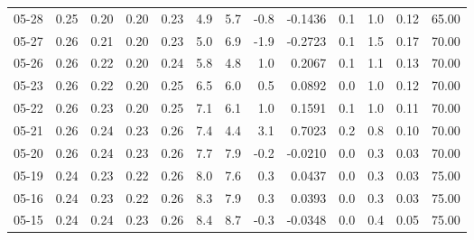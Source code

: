 \begin{threeparttable}
{\begin{tabular}{lrrrrrrrrrrrr}
  05-28 &          0.25 &          0.20 &          0.20 &        0.23 &                 4.9 &                 5.7 &       -0.8 &      -0.1436 &                 0.1 &              1.0 &            0.12 &                  65.00 \\
  05-27 &          0.26 &          0.21 &          0.20 &        0.23 &                 5.0 &                 6.9 &       -1.9 &      -0.2723 &                 0.1 &              1.5 &            0.17 &                  70.00 \\
  05-26 &          0.26 &          0.22 &          0.20 &        0.24 &                 5.8 &                 4.8 &        1.0 &       0.2067 &                 0.1 &              1.1 &            0.13 &                  70.00 \\
  05-23 &          0.26 &          0.22 &          0.20 &        0.25 &                 6.5 &                 6.0 &        0.5 &       0.0892 &                 0.0 &              1.0 &            0.12 &                  70.00 \\
  05-22 &          0.26 &          0.23 &          0.20 &        0.25 &                 7.1 &                 6.1 &        1.0 &       0.1591 &                 0.1 &              1.0 &            0.11 &                  70.00 \\
  05-21 &          0.26 &          0.24 &          0.23 &        0.26 &                 7.4 &                 4.4 &        3.1 &       0.7023 &                 0.2 &              0.8 &            0.10 &                  70.00 \\
  05-20 &          0.26 &          0.24 &          0.23 &        0.26 &                 7.7 &                 7.9 &       -0.2 &      -0.0210 &                 0.0 &              0.3 &            0.03 &                  70.00 \\
  05-19 &          0.24 &          0.23 &          0.22 &        0.26 &                 8.0 &                 7.6 &        0.3 &       0.0437 &                 0.0 &              0.3 &            0.03 &                  75.00 \\
  05-16 &          0.24 &          0.23 &          0.22 &        0.26 &                 8.3 &                 7.9 &        0.3 &       0.0393 &                 0.0 &              0.3 &            0.03 &                  75.00 \\
  05-15 &          0.24 &          0.24 &          0.23 &        0.26 &                 8.4 &                 8.7 &       -0.3 &      -0.0348 &                 0.0 &              0.4 &            0.05 &                  75.00 \\

\end{tabular}}
\end{threeparttable}
